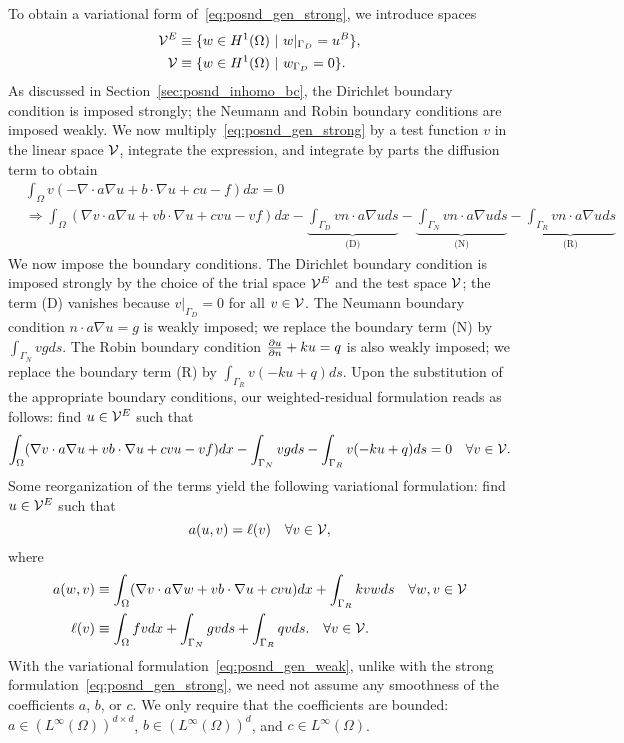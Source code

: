 To obtain a variational form of~\eqref{eq:posnd_gen_strong}, we introduce spaces
\begin{align*}
  \mathcal{V}^E &\equiv \{ w \in H^1(\Omega) \ | \ w|_{\Gamma_D} = u^B \}, \\
  \mathcal{V} &\equiv \{ w \in H^1(\Omega) \ | \ w_{\Gamma_D} = 0 \}.
\end{align*}
As discussed in Section~\ref{sec:posnd_inhomo_bc}, the Dirichlet boundary condition is imposed strongly; the Neumann and Robin boundary conditions are imposed weakly.  We now multiply~\eqref{eq:posnd_gen_strong} by a test function $v$ in the linear space $\mathcal{V}$, integrate the expression, and integrate by parts the diffusion term to obtain
\begin{align*}
  &\int_\Omega v (- \nabla \cdot a \nabla u + b \cdot \nabla u + c u - f) dx = 0 \\
  & \Rightarrow
  \int_\Omega (\nabla v \cdot a \nabla u  + v b \cdot \nabla u + c vu -vf ) dx
  -  \underbrace{\int_{\Gamma_D} v n \cdot a \nabla u ds}_{\text{(D)}}
  - \underbrace{\int_{\Gamma_N} v n \cdot a \nabla u ds}_{\text{(N)}}
  - \underbrace{\int_{\Gamma_R} v n \cdot a \nabla u ds}_{\text{(R)}}
\end{align*}
We now impose the boundary conditions.  The Dirichlet boundary condition is imposed strongly by the choice of the trial space $\mathcal{V}^E$ and the test space $\mathcal{V}$; the term (D) vanishes because $v|_{\Gamma_D} = 0$ for all $v \in \mathcal{V}$.  The Neumann boundary condition $n \cdot a \nabla u = g$ is weakly imposed; we replace the boundary term (N) by $\int_{\Gamma_N} v g ds$.  The Robin boundary condition $\frac{\partial u}{\partial n} + k u = q$ is also weakly imposed; we replace the boundary term (R) by $\int_{\Gamma_R} v (-ku + q) ds$.  Upon the substitution of the appropriate boundary conditions, our weighted-residual formulation reads as follows: find $u \in \mathcal{V}^E$ such that
\begin{equation*}
  \int_\Omega (\nabla v \cdot a \nabla u  + v b \cdot \nabla u + c vu - vf) dx
  - \int_{\Gamma_N} v g ds - \int_{\Gamma_R} v (-ku + q) ds = 0
  \quad \forall v \in \mathcal{V}.
\end{equation*}
Some reorganization of the terms yield the following variational formulation: find $u \in \mathcal{V}^E$ such that
\begin{equation}
  a(u,v) = \ell(v) \quad \forall v \in \mathcal{V},
  \label{eq:posnd_gen_weak}
\end{equation}
where
\begin{align*}
  a(w,v) &\equiv \int_\Omega (\nabla v \cdot a \nabla w + v b \cdot \nabla u + c vu ) dx + \int_{\Gamma_R} k vw ds \quad \forall w, v \in \mathcal{V} \\
  \ell(v) &\equiv \int_\Omega fv dx + \int_{\Gamma_N} gv ds + \int_{\Gamma_R} qv ds.
  \quad \forall v \in \mathcal{V}.
\end{align*}
With the variational formulation~\eqref{eq:posnd_gen_weak}, unlike with the strong formulation~\eqref{eq:posnd_gen_strong}, we need not assume any smoothness of the coefficients $a$, $b$, or $c$.  We only require that the coefficients are bounded: $a \in (L^\infty(\Omega))^{d \times d}$, $b \in (L^\infty(\Omega))^d$, and $c \in L^\infty(\Omega)$.


